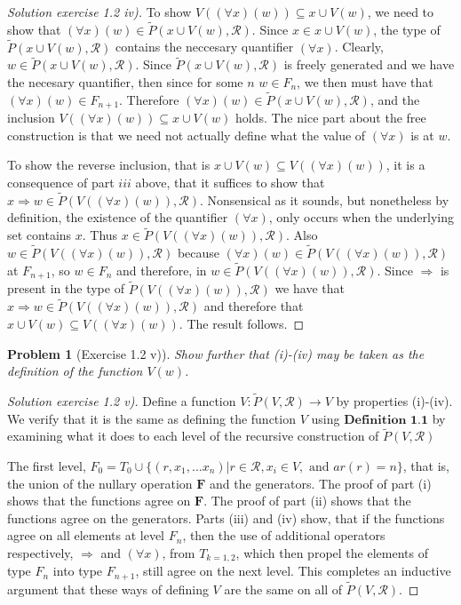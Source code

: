 \documentclass{article}
\theoremstyle{problemstyle}
\newtheorem{problem}{Problem}
\begin{document}
\begin{proof}[Solution exercise 1.2 iv)]
To show $V((\forall x)(w)) \subseteq {x} \cup V(w)$, we need to show that $(\forall x)(w) \in \widetilde{P}({x} \cup V(w),\mathscr{R})$. Since $x \in {x} \cup V(w)$, the type of $\widetilde{P}({x} \cup V(w),\mathscr{R})$ contains the neccesary quantifier $(\forall x)$. Clearly, $w \in \widetilde{P}({x} \cup V(w),\mathscr{R})$. Since $\widetilde{P}({x} \cup V(w),\mathscr{R})$ is freely generated and we have the necesary quantifier, then since for some $n$ $w \in F_n$, we then must have that $(\forall x)(w) \in F_{n+1}$. Therefore $(\forall x)(w) \in \widetilde{P}({x} \cup V(w),\mathscr{R})$, and the inclusion $V((\forall x)(w)) \subseteq {x} \cup V(w)$ holds. The nice part about the free construction is that we need not actually define what the value of $(\forall x)$ is at $w$. 

To show the reverse inclusion, that is ${x} \cup V(w) \subseteq V((\forall x)(w))$, it is a consequence of part $iii$ above, that it suffices to show that $x \Rightarrow w \in \widetilde{P}(V((\forall x)(w)), \mathscr{R})$. Nonsensical as it sounds, but nonetheless by definition, the existence of the quantifier $(\forall x)$, only occurs when the underlying set contains $x$. Thus $x \in \widetilde{P}(V((\forall x)(w)), \mathscr{R})$. Also $w \in \widetilde{P}(V((\forall x)(w)), \mathscr{R})$ because $(\forall x)(w) \in \widetilde{P}(V((\forall x)(w)), \mathscr{R})$ at $F_{n+1}$, so $w \in F_{n}$ and therefore, in $w \in \widetilde{P}(V((\forall x)(w)), \mathscr{R})$. Since $\Rightarrow$ is present in the type of $\widetilde{P}(V((\forall x)(w)), \mathscr{R})$ we have that $x \Rightarrow w \in \widetilde{P}(V((\forall x)(w)), \mathscr{R})$ and therefore that ${x} \cup V(w) \subseteq V((\forall x)(w))$. The result follows. 
\end{proof}

\begin{problem}[Exercise 1.2 v)] 
Show further that (i)-(iv) may be taken as the definition of the function $V(w)$.
\end{problem}

\begin{proof}[Solution exercise 1.2 v)] 
Define a function $V:\widetilde{P}(V, \mathscr{R}) \rightarrow V$ by properties (i)-(iv). We verify that it is the same as defining the function $V$ using $\textbf{Definition 1.1}$ by examining what it does to each level of the recursive construction of $\widetilde{P}(V, \mathscr{R})$

The first level, $F_0 = T_0 \cup \{(r,x_1,...x_n)|r \in \mathscr{R}, x_i \in V, \text{ and }ar(r) = n\}$, that is, the union of the nullary operation $\textbf{F}$ and the generators. The proof of part (i) shows that the functions agree on $\textbf{F}$. The proof of part (ii) shows that the functions agree on the generators. Parts (iii) and (iv) show, that if the functions agree on all elements at level $F_n$, then the use of additional operators respectively, $\Rightarrow$ and $(\forall x)$, from $T_{k=1,2}$, which then propel the elements of type $F_n$ into type $F_{n+1}$, still agree on the next level. This completes an inductive argument that these ways of defining $V$ are the same on all of $\widetilde{P}(V, \mathscr{R})$.
\end{proof}
\end{document}
